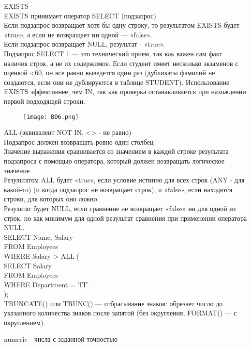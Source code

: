 \noindent EXISTS \\
EXISTS принимает оператор SELECT (подзапрос) \\
Если подзапрос возвращает хотя бы одну строку, то результатом EXISTS будет «true», а если не возвращает ни одной — «false». \\
Если подзапрос возвращает NULL, результат - «true». \\
Подзапрос SELECT 1 — это технический прием, так как важен сам факт наличия строк, а не их содержимое. Если студент имеет несколько экзаменов с оценкой <60, он все равно выведется один раз (дубликаты фамилий не создаются, если они не дублируются в таблице STUDENT). Использование EXISTS эффективнее, чем IN, так как проверка останавливается при нахождении первой подходящей строки.
\begin{figure}[H]
    \centering
    \texttt{[image: BD6.png]}
\end{figure}

\noindent ALL (эквивалент NOT IN, <> - не равно) \\
Подзапрос должен возвращать ровно один столбец \\
Значение выражения сравнивается со значением в каждой строке результата подзапроса с помощью оператора, который должен возвращать логическое значение. \\
Результатом ALL будет «true», если условие истинно для всех строк (ANY - для какой-то) (и когда подзапрос не возвращает строк), и «false», если находятся строки, для которых оно ложно. \\
Результат будет NULL, если сравнение не возвращает «false» ни для одной из строк, но как минимум для одной результат сравнения при применении оператора NULL. \\
SELECT Name, Salary \\
FROM Employees \\
WHERE Salary > ALL ( \\
    SELECT Salary  \\
    FROM Employees  \\
    WHERE Department = 'IT' \\
); \\

\noindent TRUNCATE() или TRUNC() — отбрасывание знаков: обрезает число до указанного количества знаков после запятой (без округления, FORMAT() — с округлением).

\noindent numeric - числа с заданной точностью \\


